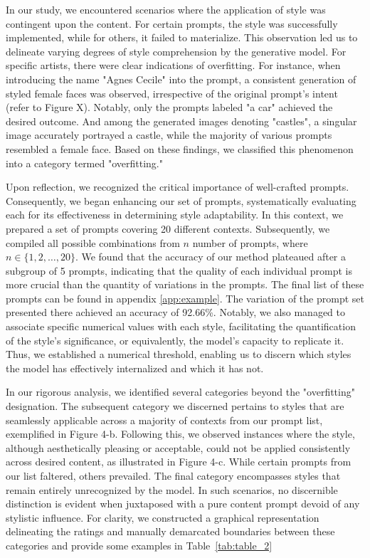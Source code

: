 \documentclass[12pt, letterpaper]{article}
\begin{document}
In our study, we encountered scenarios where the application of style was contingent upon the content. For certain prompts, the style was successfully implemented, while for others, it failed to materialize. This observation led us to delineate varying degrees of style comprehension by the generative model. For specific artists, there were clear indications of overfitting. For instance, when introducing the name "Agnes Cecile" into the prompt, a consistent generation of styled female faces was observed, irrespective of the original prompt's intent (refer to Figure X). Notably, only the prompts labeled "a car" achieved the desired outcome. And among the generated images denoting "castles", a singular image accurately portrayed a castle, while the majority of various prompts resembled a female face. Based on these findings, we classified this phenomenon into a category termed "overfitting."

Upon reflection, we recognized the critical importance of well-crafted prompts. Consequently, we began enhancing our set of prompts, systematically evaluating each for its effectiveness in determining style adaptability. In this context, we prepared a set of prompts covering 20 different contexts. Subsequently, we compiled all possible combinations from $n$ number of prompts, where {$n \in \{1, 2, \ldots, 20\}$}. We found that the accuracy of our method plateaued after a subgroup of 5 prompts, indicating that the quality of each individual prompt is more crucial than the quantity of variations in the prompts. The final list of these prompts can be found in appendix \ref{app:example}. The variation of the prompt set presented there achieved an accuracy of 92.66\%. Notably, we also managed to associate specific numerical values with each style, facilitating the quantification of the style's significance, or equivalently, the model's capacity to replicate it. Thus, we established a numerical threshold, enabling us to discern which styles the model has effectively internalized and which it has not.

In our rigorous analysis, we identified several categories beyond the "overfitting" designation.
The subsequent category we discerned pertains to styles that are seamlessly applicable across a majority of contexts from our prompt list, exemplified in Figure 4-b. Following this, we observed instances where the style, although aesthetically pleasing or acceptable, could not be applied consistently across desired content, as illustrated in Figure 4-c. While certain prompts from our list faltered, others prevailed. The final category encompasses styles that remain entirely unrecognized by the model. In such scenarios, no discernible distinction is evident when juxtaposed with a pure content prompt devoid of any stylistic influence. For clarity, we constructed a graphical representation delineating the ratings and manually demarcated boundaries between these categories and provide some examples in Table~\ref{tab:table_2}
\end{document}
